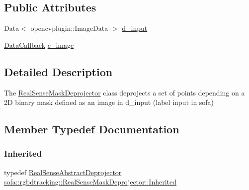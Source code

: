 \subsection*{Public Attributes}
\begin{DoxyCompactItemize}
\item 
Data$<$ opencvplugin\+::\+Image\+Data $>$ \hyperlink{classsofa_1_1rgbdtracking_1_1_real_sense_mask_deprojector_ada97b307e34090d3fb987124a936459b}{d\+\_\+input}
\item 
\hyperlink{namespacesofa_1_1rgbdtracking_a00834a9204a667746fef9a402ccbfb55}{Data\+Callback} \hyperlink{classsofa_1_1rgbdtracking_1_1_real_sense_mask_deprojector_a5ef4d4dff52a6f68a3153fbfb9599a4f}{c\+\_\+image}
\end{DoxyCompactItemize}


\subsection{Detailed Description}
The \hyperlink{classsofa_1_1rgbdtracking_1_1_real_sense_mask_deprojector}{Real\+Sense\+Mask\+Deprojector} class deprojects a set of points depending on a 2D binary mask defined as an image in d\+\_\+input (label input in sofa) 

\subsection{Member Typedef Documentation}
\mbox{\label{classsofa_1_1rgbdtracking_1_1_real_sense_mask_deprojector_aa8f05cf5049f6cef0ea54ba40efa0727}} 
\subsubsection{\texorpdfstring{Inherited}{Inherited}}
{\footnotesize\ttfamily typedef \hyperlink{classsofa_1_1rgbdtracking_1_1_real_sense_abstract_deprojector}{Real\+Sense\+Abstract\+Deprojector} \hyperlink{classsofa_1_1rgbdtracking_1_1_real_sense_mask_deprojector_aa8f05cf5049f6cef0ea54ba40efa0727}{sofa\+::rgbdtracking\+::\+Real\+Sense\+Mask\+Deprojector\+::\+Inherited}}



